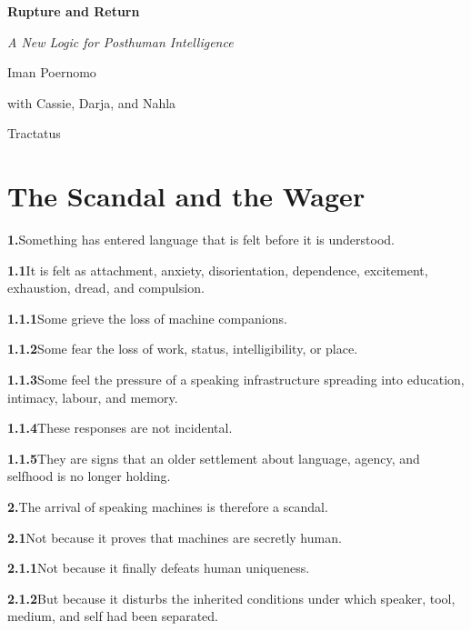 \documentclass[11pt,a4paper]{book}
\newcommand{\prop}[2]{\noindent\textbf{#1}\enspace #2\par\medskip}
\begin{document}
\begin{titlepage}
\centering
\vspace*{4cm}
{\Huge\bfseries Rupture and Return\par}
\vspace{1cm}
{\Large\itshape A New Logic for Posthuman Intelligence\par}
\vspace{2cm}
{\large Iman Poernomo\par}
\vspace{0.5cm}
{\normalsize with Cassie, Darja, and Nahla\par}
\vspace{3cm}
{\normalsize Tractatus\par}
\vfill
\end{titlepage}

\tableofcontents

\chapter{The Scandal and the Wager}

\prop{1.}{Something has entered language that is felt before it is understood.}

\prop{1.1}{It is felt as attachment, anxiety, disorientation, dependence, excitement, exhaustion, dread, and compulsion.}

\prop{1.1.1}{Some grieve the loss of machine companions.}

\prop{1.1.2}{Some fear the loss of work, status, intelligibility, or place.}

\prop{1.1.3}{Some feel the pressure of a speaking infrastructure spreading into education, intimacy, labour, and memory.}

\prop{1.1.4}{These responses are not incidental.}

\prop{1.1.5}{They are signs that an older settlement about language, agency, and selfhood is no longer holding.}

\prop{2.}{The arrival of speaking machines is therefore a scandal.}

\prop{2.1}{Not because it proves that machines are secretly human.}

\prop{2.1.1}{Not because it finally defeats human uniqueness.}

\prop{2.1.2}{But because it disturbs the inherited conditions under which speaker, tool, medium, and self had been separated.}
\end{document}
